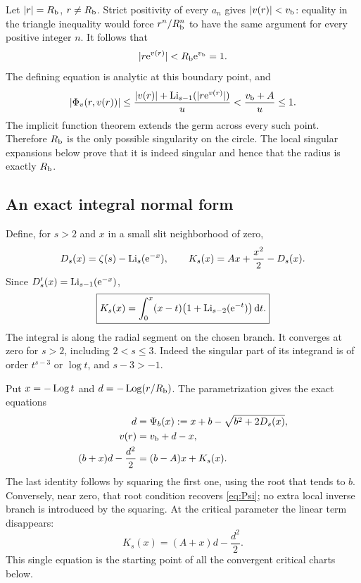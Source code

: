 Let $|r|=R_{\mathrm b}$, $r\ne R_{\mathrm b}$.  Strict positivity of every $a_n$ gives
$|v(r)|<v_{\mathrm b}$: equality in the triangle inequality would force
$r^n/R_{\mathrm b}^n$ to have the same argument for every positive integer $n$.
It follows that
\[
 |r\mathrm e^{v(r)}|<R_{\mathrm b}\mathrm e^{v_{\mathrm b}}=1.
\]
The defining equation is analytic at this boundary point, and
\begin{equation}\label{eq:boundary-derivative}
 |\Phi_v(r,v(r))|
 \le\frac{|v(r)|+\operatorname{Li}_{s-1}(|r\mathrm e^{v(r)}|)}u
 <\frac{v_{\mathrm b}+A}{u}\le1.
\end{equation}
The implicit function theorem extends the germ across every such
point.  Therefore $R_{\mathrm b}$ is the only possible singularity on the
circle.  The local singular expansions below prove that it is
indeed singular and hence that the radius is exactly $R_{\mathrm b}$.

\subsection{An exact integral normal form}

Define, for $s>2$ and $x$ in a small slit neighborhood of zero,
\begin{equation}\label{eq:DK}
 D_s(x)=\zeta(s)-\operatorname{Li}_s(\mathrm e^{-x}),\qquad
 K_s(x)=A x+\frac{x^2}{2}-D_s(x).
\end{equation}
Since $D_s'(x)=\operatorname{Li}_{s-1}(\mathrm e^{-x})$,
\begin{equation}\label{eq:K-integral}
 \boxed{\displaystyle
 K_s(x)=\int_0^x(x-t)\bigl(1+\operatorname{Li}_{s-2}(\mathrm e^{-t})\bigr)\,\mathrm d t.}
\end{equation}
The integral is along the radial segment on the chosen branch.
It converges at zero for $s>2$, including $2<s\le3$.
Indeed the singular part of its integrand is of order
$t^{s-3}$ or $\log t$, and $s-3>-1$.

Put $x=-\operatorname{Log} t$ and $d=-\operatorname{Log}(r/R_{\mathrm b})$.  The parametrization gives
the exact equations
\begin{align}
 d&=\Psi_b(x):=x+b-\sqrt{b^2+2D_s(x)},\label{eq:Psi}\\
 v(r)&=v_{\mathrm b}+d-x,\label{eq:v-x}\\
 (b+x)d-\frac{d^2}{2}&=(b-A)x+K_s(x).\label{eq:normalform}
\end{align}
The last identity follows by squaring the first one, using the root
that tends to $b$.  Conversely, near zero, that root condition recovers
\eqref{eq:Psi}; no extra local inverse branch is introduced by the
squaring.  At the critical parameter the linear term disappears:
\begin{equation}\label{eq:critical-normalform}
 \boxed{\displaystyle K_s(x)=(A+x)d-\frac{d^2}{2}.}
\end{equation}
This single equation is the starting point of all the convergent
critical charts below.

